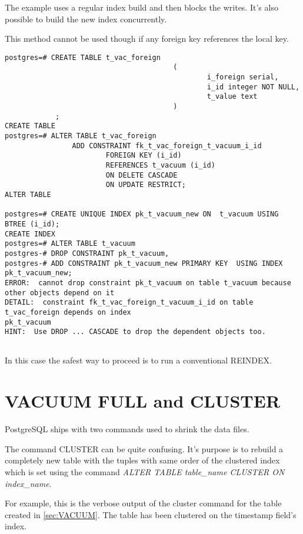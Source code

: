 The example uses a regular index build and then blocks the writes. It's also possible to
build the new index concurrently.

This method cannot be used though if any foreign key references the local key.

\begin{lstlisting}[style=pgsql]
 postgres=# CREATE TABLE t_vac_foreign
                                        (
                                                i_foreign serial,
                                                i_id integer NOT NULL,
                                                t_value text
                                        )
            ;
CREATE TABLE
postgres=# ALTER TABLE t_vac_foreign
                ADD CONSTRAINT fk_t_vac_foreign_t_vacuum_i_id
                        FOREIGN KEY (i_id)
                        REFERENCES t_vacuum (i_id)
                        ON DELETE CASCADE
                        ON UPDATE RESTRICT;
ALTER TABLE

postgres=# CREATE UNIQUE INDEX pk_t_vacuum_new ON  t_vacuum USING BTREE (i_id);
CREATE INDEX
postgres=# ALTER TABLE t_vacuum
postgres-# DROP CONSTRAINT pk_t_vacuum,
postgres-# ADD CONSTRAINT pk_t_vacuum_new PRIMARY KEY  USING INDEX pk_t_vacuum_new;
ERROR:  cannot drop constraint pk_t_vacuum on table t_vacuum because other objects depend on it
DETAIL:  constraint fk_t_vac_foreign_t_vacuum_i_id on table t_vac_foreign depends on index
pk_t_vacuum
HINT:  Use DROP ... CASCADE to drop the dependent objects too.


\end{lstlisting}

In this case the safest way to proceed is to run a conventional REINDEX.


\section{VACUUM FULL and CLUSTER}
\label{sec:VACFULL}
PostgreSQL ships with two commands used to shrink the data files.\newline

The command CLUSTER can be quite confusing. It's purpose is to rebuild a completely new table with
the tuples with same order of the clustered index which is set using  the  command
\textit{ALTER TABLE table\_name CLUSTER ON index\_name}.\newline

For example, this is the verbose output of the cluster command for the table created in \ref{sec:VACUUM}.
The table has been clustered on the timestamp field's index.


